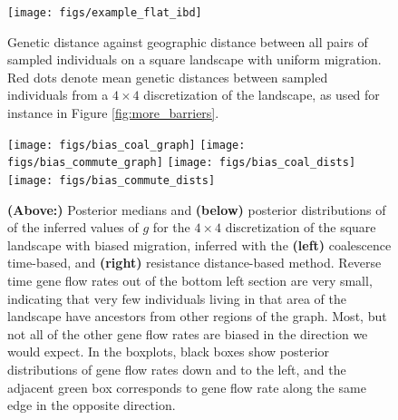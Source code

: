 \documentclass{article}
\begin{document}
\begin{figure}
\centering
     \texttt{[image: figs/example\_flat\_ibd]}
    \caption{
        Genetic distance against geographic distance
        between all pairs of sampled individuals
        on a square landscape with uniform migration.
        Red dots denote mean genetic distances
        between sampled individuals from a $4 \times 4$ discretization of the landscape,
        as used for instance in Figure \ref{fig:more_barriers}.
    \label{fig:ibd_comp}
    }
\end{figure}

\begin{figure}
\centering
    \texttt{[image: figs/bias\_coal\_graph]}
    \texttt{[image: figs/bias\_commute\_graph]}
    \texttt{[image: figs/bias\_coal\_dists]}
    \texttt{[image: figs/bias\_commute\_dists]}
\caption{
    \textbf{(Above:)} Posterior medians and \textbf{(below)} posterior distributions
    of of the inferred values of $g$ 
    for the $4 \times 4$ discretization 
    of the square landscape with biased migration,
    inferred with the
    \textbf{(left)} coalescence time-based,
    and \textbf{(right)} resistance distance-based method.
    Reverse time gene flow rates out of the bottom left section are very small,
    indicating that very few individuals living in that area of the landscape
    have ancestors from other regions of the graph.
    Most, but not all of the other gene flow rates are biased 
    in the direction we would expect.
    In the boxplots,
    black boxes show posterior distributions of gene flow rates down and to the left,
    and the adjacent green box corresponds to gene flow rate along the same edge
    in the opposite direction. 
    }
\label{fig:grid_bias_4x4_1}
\end{figure}
\end{document}
